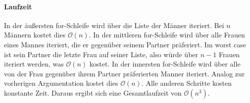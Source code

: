 \documentclass[12pt]{scrartcl}%
\theoremstyle{nonumberplain}
\newcommand{\bO}[1]{\mathcal O(#1)}
\begin{document}
\paragraph{Laufzeit}In der äußersten for-Schleife wird über die Liste der Männer iteriert. Bei $n$ Männern kostet dies $\bO{n}$. In der mittleren for-Schleife wird über alle Frauen eines Mannes iteriert, die er gegenüber seinem Partner präferiert. Im worst case ist sein Partner die letzte Frau auf seiner Liste, also würde über $n-1$ Frauen iteriert werden, was $\bO{n}$ kostet. In der innersten for-Schleife wird über alle von der Frau gegenüber ihrem Partner präferierten Manner iteriert. Analog zur vorherigen Argumentation kostet dies $\bO{n}$. Alle anderen Schritte kosten konstante Zeit. Daraus ergibt sich eine Gesamtlaufzeit von $\bO{n^3}$.
\end{document}
